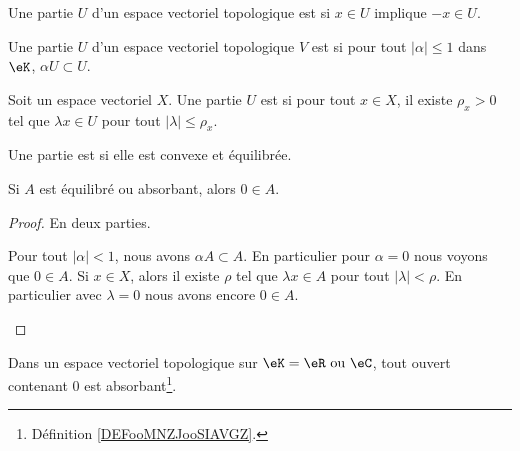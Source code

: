 \begin{definition}		\label{DEFooKBMAooAhYQAm}
	Une partie \( U\) d'un espace vectoriel topologique est  si \( x\in U\) implique \( -x\in U\).
\end{definition}

\begin{definition}		\label{DEFooPNRIooEFAlii}
	Une partie \( U\) d'un espace vectoriel topologique \( V\) est  si pour tout \( | \alpha |\leq 1\) dans \( \eK\), \( \alpha U\subset U\).
\end{definition}

\begin{definition}		\label{DEFooMNZJooSIAVGZ}
	Soit un espace vectoriel \( X\). Une partie \( U\) est  si pour tout \( x\in X\), il existe \( \rho_x>0\) tel que \( \lambda x\in U\) pour tout \( | \lambda |\leq \rho_x\).
\end{definition}

\begin{definition} \label{DEFooYSWJooPkcrJe}
	Une partie est  si elle est convexe et équilibrée.
\end{definition}

\begin{lemma}		\label{LEMooXKOTooLWDXhp}
	Si \( A\) est équilibré ou absorbant, alors \( 0\in A\).
\end{lemma}

\begin{proof}
	En deux parties.
	\begin{subproof}
		Pour tout \( | \alpha |<1\), nous avons \( \alpha A\subset A\). En particulier pour \( \alpha=0\) nous voyons que \( 0\in A\).
		Si \( x\in X\), alors il existe \( \rho\) tel que \( \lambda x\in A\) pour tout \( | \lambda |<\rho\). En particulier avec \( \lambda=0\) nous avons encore \( 0\in A\).
	\end{subproof}
\end{proof}



\begin{lemma}		\label{LEMooEEKYooVCnBMq}
	Dans un espace vectoriel topologique sur \( \eK=\eR\text{ ou }\eC\), tout ouvert contenant \( 0\) est absorbant\footnote{Définition \ref{DEFooMNZJooSIAVGZ}.}.
\end{lemma}

